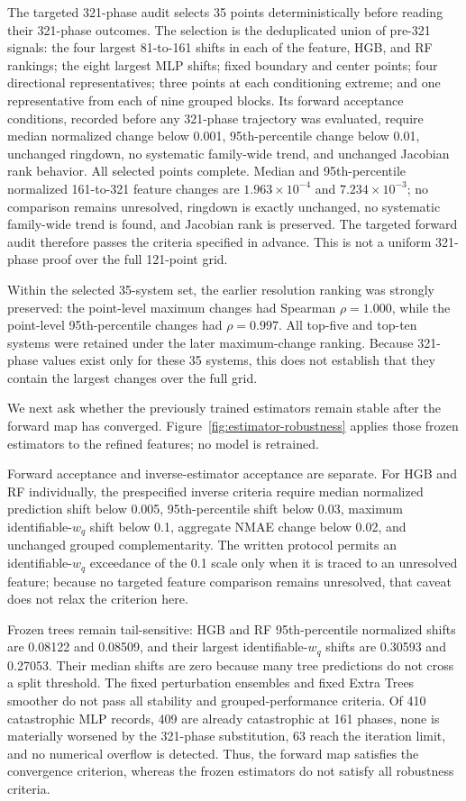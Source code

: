 \documentclass[11pt]{article}
\newcommand{\wq}{w_q}
\begin{document}
The targeted 321-phase audit selects 35 points deterministically before reading
their 321-phase outcomes. The selection is the deduplicated union of pre-321
signals: the four largest 81-to-161 shifts in each of the feature, HGB, and RF
rankings; the eight largest MLP shifts; fixed boundary and center points; four
directional representatives; three points at each conditioning extreme; and one
representative from each of nine grouped blocks. Its forward acceptance
conditions, recorded before any 321-phase trajectory was evaluated, require
median normalized change below
0.001, 95th-percentile change below 0.01, unchanged ringdown, no systematic
family-wide trend, and unchanged Jacobian rank behavior. All selected points
complete. Median and 95th-percentile normalized 161-to-321 feature changes are
$1.963\times10^{-4}$ and $7.234\times10^{-3}$; no comparison remains
unresolved, ringdown is exactly unchanged, no systematic family-wide trend is
found, and Jacobian rank is preserved. The targeted forward audit therefore
passes the criteria specified in advance. This is not a uniform 321-phase proof
over the full 121-point grid.

Within the selected 35-system set, the earlier resolution ranking was strongly
preserved: the point-level maximum changes had Spearman $\rho=1.000$, while the
point-level 95th-percentile changes had $\rho=0.997$. All top-five and top-ten
systems were retained under the later maximum-change ranking. Because
321-phase values exist only for these 35 systems, this does not establish that
they contain the largest changes over the full grid.

We next ask whether the previously trained estimators remain stable after the
forward map has converged. Figure~\ref{fig:estimator-robustness} applies those
frozen estimators to the refined features; no model is retrained.

Forward acceptance and inverse-estimator acceptance are separate. For HGB and
RF individually, the prespecified inverse criteria require median normalized
prediction shift below 0.005, 95th-percentile shift below 0.03, maximum
identifiable-$\wq$ shift below 0.1, aggregate NMAE change below 0.02, and
unchanged grouped complementarity. The written protocol permits an
identifiable-$\wq$ exceedance of the 0.1 scale only when it is traced to an
unresolved feature; because no targeted feature comparison remains unresolved,
that caveat does not relax the criterion here.

Frozen trees remain tail-sensitive: HGB and RF 95th-percentile normalized
shifts are 0.08122 and 0.08509, and their largest identifiable-$\wq$ shifts are
0.30593 and 0.27053. Their median shifts are zero because many tree predictions do
not cross a split threshold. The fixed perturbation ensembles and fixed
Extra Trees smoother do not pass all stability and grouped-performance
criteria. Of 410 catastrophic MLP records, 409 are already catastrophic at 161
phases, none is materially worsened by the 321-phase substitution, 63 reach the
iteration limit, and no numerical overflow is detected. Thus, the forward map
satisfies the convergence criterion, whereas the frozen estimators do not
satisfy all robustness criteria.
\end{document}
